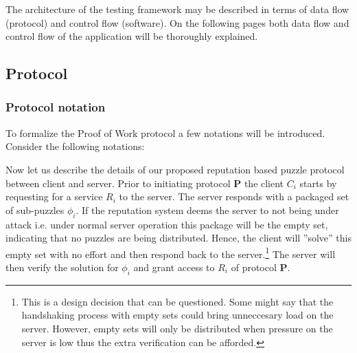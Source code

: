 The architecture of the testing framework may be described in terms of data flow (protocol) and control flow (software). On the following pages both data flow and control flow of the application will be thoroughly explained.

\subsection{Protocol}

\subsubsection{Protocol notation}
To formalize the Proof of Work protocol a few notations will be introduced. Consider the following notations:



Now let us describe the details of our proposed reputation based puzzle protocol between client and server. Prior to initiating protocol \textbf{P} the client $C_i$ starts by requesting for a service $R_i$ to the server. The server responds with a packaged set of sub-puzzles $\phi_i$. If the reputation system deems the server to not being under attack i.e. under normal server operation this package will be the empty set, indicating that no puzzles are being distributed. Hence, the client will ''solve'' this empty set with no effort and then respond back to the server.\footnote{This is a design decision that can be questioned. Some might say that the handshaking process with empty sets could bring unneccesary load on the server. However, empty sets will only be distributed when pressure on the server is low thus the extra verification can be afforded.} The server will then verify the solution for $\phi_i$ and grant access to $R_i$ of protocol \textbf{P}.

